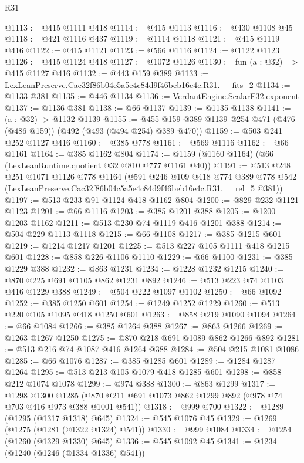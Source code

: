 \begin{lexlean}{R31}
\begin{coremodule}
@1113 := @415 @1111 @418
@1114 := @415 @1113
@1116 := @430 @1108 @45
@1118 := @421 @1116 @437
@1119 := @1114 @1118
@1121 := @415 @1119 @416
@1122 := @415 @1121
@1123 := @566 @1116
@1124 := @1122 @1123
@1126 := @415 @1124 @418
@1127 := @1072 @1126
@1130 := fun (a : @32) => @415 @1127 @416
@1132 := @443 @159 @389
@1133 := LexLeanPreserve.Cac32f86b04c5a5e4c84d9f46beb16e4c.R31.__fits_2
@1134 := @1133 @381
@1135 := @446 @1134
@1136 := VerdantEngine.ScalarF32.exponent
@1137 := @1136 @381
@1138 := @66 @1137
@1139 := @1135 @1138
@1141 := (a : @32) -> @1132 @1139
@1155 := @455 @159 @389 @1139 @254 @471 (@476 (@486 @159)) (@492 (@493 (@494 @254) @389 @470))
@1159 := @503 @241 @252 @1127 @416
@1160 := @385 @778
@1161 := @569 @1116
@1162 := @66 @1161
@1164 := @385 @1162 @804
@1174 := @1159 (@1160 @1164) (@66 (LexLeanRuntime.quotient @32 @810 @777 @1161 @40))
@1191 := @513
    @248
    @251
    @1071
    @1126
    @778
    @1164
    (@591
      @246
      @109
      @418
      @774
      @389
      @778
      @542
      (LexLeanPreserve.Cac32f86b04c5a5e4c84d9f46beb16e4c.R31.__rel_5 @381))
@1197 := @513 @233 @91 @1124 @418 @1162 @804
@1200 := @829 @232 @1121 @1123
@1201 := @66 @1116
@1203 := @385 @1201 @388
@1205 := @1200 @1203 @1162
@1211 := @513 @230 @74 @1119 @416 @1201 @388
@1214 := @504 @229 @1113 @1118
@1215 := @66 @1108
@1217 := @385 @1215 @601
@1219 := @1214 @1217 @1201
@1225 := @513 @227 @105 @1111 @418 @1215 @601
@1228 := @858 @226 @1106 @1110
@1229 := @66 @1100
@1231 := @385 @1229 @388
@1232 := @863 @1231
@1234 := @1228 @1232 @1215
@1240 := @870 @225 @691 @1105 @862 @1231 @892
@1246 := @513 @223 @74 @1103 @416 @1229 @388
@1249 := @504 @222 @1097 @1102
@1250 := @66 @1092
@1252 := @385 @1250 @601
@1254 := @1249 @1252 @1229
@1260 := @513 @220 @105 @1095 @418 @1250 @601
@1263 := @858 @219 @1090 @1094
@1264 := @66 @1084
@1266 := @385 @1264 @388
@1267 := @863 @1266
@1269 := @1263 @1267 @1250
@1275 := @870 @218 @691 @1089 @862 @1266 @892
@1281 := @513 @216 @74 @1087 @416 @1264 @388
@1284 := @504 @215 @1081 @1086
@1285 := @66 @1076
@1287 := @385 @1285 @601
@1289 := @1284 @1287 @1264
@1295 := @513 @213 @105 @1079 @418 @1285 @601
@1298 := @858 @212 @1074 @1078
@1299 := @974 @388
@1300 := @863 @1299
@1317 := @1298
    @1300
    @1285
    (@870 @211 @691 @1073 @862 @1299 @892 (@978 @74 @703 @416 @973 @388 @1001 @541))
@1318 := @999 @700
@1322 := @1289 (@1295 (@1317 @1318) @645)
@1324 := @545 @1076 @45
@1329 := @1269 (@1275 (@1281 (@1322 @1324) @541))
@1330 := @999 @1084
@1334 := @1254 (@1260 (@1329 @1330) @645)
@1336 := @545 @1092 @45
@1341 := @1234 (@1240 (@1246 (@1334 @1336) @541))

\end{coremodule}
\end{lexlean}
